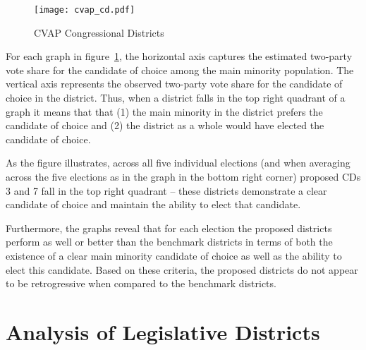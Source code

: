 \documentclass[12pt]{scrartcl}
\begin{document}
\begin{figure}[!h]
\begin{centering}
\texttt{[image: cvap\_cd.pdf]}
\caption{CVAP Congressional Districts}
\end{centering}
\label{cvap_cd}
\end{figure}

For each graph in figure~\ref{cvap_cd}, the horizontal axis captures the estimated two-party vote share for the candidate of choice among the main minority population. The vertical axis represents the observed two-party vote share for the candidate of choice in the district. Thus, when a district falls in the top right quadrant of a graph it means that that (1) the main minority in the district prefers the candidate of choice and (2) the district as a whole would have elected the candidate of choice. 

As the figure illustrates, across all five individual elections (and when averaging across the five elections as in the graph in the bottom right corner) proposed CDs 3 and 7 fall in the top right quadrant -- these districts demonstrate a clear candidate of choice and maintain the ability to elect that candidate. 

Furthermore, the graphs reveal that for each election the proposed districts perform as well or better than the benchmark districts in terms of both the existence of a clear main minority candidate of choice as well as the ability to elect this candidate. Based on these criteria, the proposed districts do not appear to be retrogressive when compared to the benchmark districts.



\section{Analysis of Legislative Districts}
\end{document}
